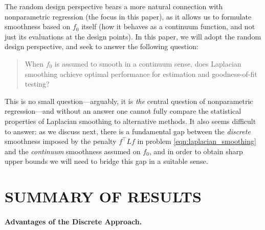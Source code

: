 \documentclass[twoside]{article}
\newcommand{\1}{\mathbf{1}}
\newcommand{\Lap}{L}
\theoremstyle{definition}
\theoremstyle{remark}
\begin{document}
The random design perspective bears a more natural connection with nonparametric regression (the focus in this paper), as it allows us to formulate smoothness based on $f_0$ itself (how it behaves as a continuum function, and not just its evaluations at the design points). In this paper, we will adopt the random design perspective, and seek to answer the following question:
\begin{quote}{When $f_0$ is assumed to smooth in a continuum sense, does Laplacian smoothing achieve optimal performance for estimation and goodness-of-fit testing?} 
\end{quote}
This is no small question---arguably, it is \emph{the} central question of nonparametric regression---and without an answer one cannot fully compare the statistical properties of Laplacian smoothing to alternative methods. It also seems difficult to answer: as we discuss next, there is a fundamental gap between the \emph{discrete} smoothness imposed by the penalty $f^\top \Lap f$ in problem \eqref{eqn:laplacian_smoothing} and the \emph{continuum} smoothness assumed on $f_0$, and in order to obtain sharp upper bounds we will need to bridge this gap in a suitable sense.

\section{SUMMARY OF RESULTS}

\paragraph{Advantages of the Discrete Approach.} 
\end{document}
